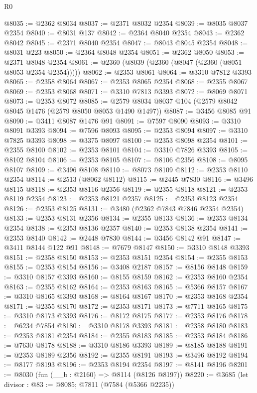 \begin{lexlean}{R0}
\begin{coremodule}
@8035 := @2362 @8034
@8037 := @2371 @8032 @2354
@8039 := @8035 @8037 @2354
@8040 := @8031 @137
@8042 := @2364 @8040 @2354
@8043 := @2362 @8042
@8045 := @2371 @8040 @2354
@8047 := @8043 @8045 @2354
@8048 := @8031 @223
@8050 := @2364 @8048 @2354
@8051 := @2362 @8050
@8053 := @2371 @8048 @2354
@8061 := @2360 (@8039 (@2360 (@8047 (@2360 (@8051 @8053 @2354 @2354)))))
@8062 := @2353 @8061
@8064 := @3310 @7812 @3393
@8065 := @2358 @8064
@8067 := @2353 @8065 @2354
@8068 := @2355 @8067
@8069 := @2353 @8068
@8071 := @3310 @7813 @3393
@8072 := @8069 @8071
@8073 := @2353 @8072
@8085 := @2579 @8034 @8037 @104 (@2579 @8042 @8045 @1476 (@2579 @8050 @8053 @1490 @1497))
@8087 := @3456 @8085 @91
@8090 := @3411 @8087 @1476 @91
@8091 := @7597 @8090
@8093 := @3310 @8091 @3393
@8094 := @7596 @8093
@8095 := @2353 @8094
@8097 := @3310 @7825 @3393
@8098 := @3375 @8097
@8100 := @2353 @8098 @2354
@8101 := @2355 @8100
@8102 := @2353 @8101
@8104 := @3310 @7826 @3393
@8105 := @8102 @8104
@8106 := @2353 @8105
@8107 := @8106 @2356
@8108 := @8095 @8107
@8109 := @3496 @8108
@8110 := @8073 @8109
@8112 := @2353 @8110 @2354
@8114 := @2513 (@8062 @8112)
@8115 := @2445 @7830
@8116 := @3496 @8115
@8118 := @2353 @8116 @2356
@8119 := @2355 @8118
@8121 := @2353 @8119 @2354
@8123 := @2353 @8121 @2357
@8125 := @2353 @8123 @2354
@8126 := @2353 @8125
@8131 := @3480 (@2362 @7843 @7846 @2354 @2354)
@8133 := @2353 @8131 @2356
@8134 := @2355 @8133
@8136 := @2353 @8134 @2354
@8138 := @2353 @8136 @2357
@8140 := @2353 @8138 @2354
@8141 := @2353 @8140
@8142 := @2448 @7830
@8144 := @3456 @8142 @91
@8147 := @3411 @8144 @122 @91
@8148 := @7679 @8147
@8150 := @3310 @8148 @3393
@8151 := @2358 @8150
@8153 := @2353 @8151 @2354
@8154 := @2355 @8153
@8155 := @2353 @8154
@8156 := @3408 @2187
@8157 := @8156 @8148
@8159 := @3310 @8157 @3393
@8160 := @8155 @8159
@8162 := @2353 @8160 @2354
@8163 := @2355 @8162
@8164 := @2353 @8163
@8165 := @5366 @8157
@8167 := @3310 @8165 @3393
@8168 := @8164 @8167
@8170 := @2353 @8168 @2354
@8171 := @2355 @8170
@8172 := @2353 @8171
@8173 := @7711 @8165
@8175 := @3310 @8173 @3393
@8176 := @8172 @8175
@8177 := @2353 @8176
@8178 := @6234 @7854
@8180 := @3310 @8178 @3393
@8181 := @2358 @8180
@8183 := @2353 @8181 @2354
@8184 := @2355 @8183
@8185 := @2353 @8184
@8186 := @7630 @8178
@8188 := @3310 @8186 @3393
@8189 := @8185 @8188
@8191 := @2353 @8189 @2356
@8192 := @2355 @8191
@8193 := @3496 @8192
@8194 := @8177 @8193
@8196 := @2353 @8194 @2354
@8197 := @8141 @8196
@8201 := @8030 (fun (__b : @2160) => @8114 (@8126 @8197))
@8220 := @3685
    (let divisor : @83 := @8085;
    @7811
      (@7584 (@5366 @2235))

\end{coremodule}
\end{lexlean}
